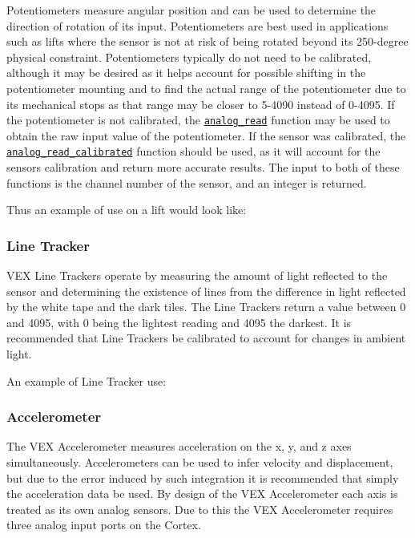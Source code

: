 Potentiometers measure angular position and can be used to determine the direction of rotation of its input. Potentiometers are best used in applications such as lifts where the sensor is not at risk of being rotated beyond its 250-\/degree physical constraint. Potentiometers typically do not need to be calibrated, although it may be desired as it helps account for possible shifting in the potentiometer mounting and to find the actual range of the potentiometer due to its mechanical stops as that range may be closer to 5-\/4090 instead of 0-\/4095. If the potentiometer is not calibrated, the \href{../../api/c/adi.html#adi-analog-read}{\tt analog\+\_\+read} function may be used to obtain the raw input value of the potentiometer. If the sensor was calibrated, the \href{../../api/c/adi.html#adi-analog-read-calibrated}{\tt analog\+\_\+read\+\_\+calibrated} function should be used, as it will account for the sensor\textquotesingle{}s calibration and return more accurate results. The input to both of these functions is the channel number of the sensor, and an integer is returned.

Thus an example of use on a lift would look like\+:

\subsubsection*{Line Tracker}

V\+EX Line Trackers operate by measuring the amount of light reflected to the sensor and determining the existence of lines from the difference in light reflected by the white tape and the dark tiles. The Line Trackers return a value between 0 and 4095, with 0 being the lightest reading and 4095 the darkest. It is recommended that Line Trackers be calibrated to account for changes in ambient light.

An example of Line Tracker use\+:

\subsubsection*{Accelerometer}

The V\+EX Accelerometer measures acceleration on the x, y, and z axes simultaneously. Accelerometers can be used to infer velocity and displacement, but due to the error induced by such integration it is recommended that simply the acceleration data be used. By design of the V\+EX Accelerometer each axis is treated as its own analog sensors. Due to this the V\+EX Accelerometer requires three analog input ports on the Cortex.

